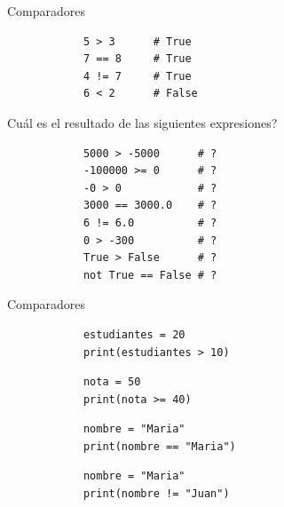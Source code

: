 \documentclass{beamer}
\begin{document}
    \begin{frame}[fragile,t]{Comparadores}
        \begin{verbatim}
            5 > 3      # True
            7 == 8     # True
            4 != 7     # True
            6 < 2      # False
        \end{verbatim}
        Cuál es el resultado de las siguientes expresiones?
        \begin{verbatim}
            5000 > -5000      # ?
            -100000 >= 0      # ?
            -0 > 0            # ?
            3000 == 3000.0    # ?
            6 != 6.0          # ?
            0 > -300          # ?
            True > False      # ?
            not True == False # ?
        \end{verbatim}
    \end{frame}

    \begin{frame}[fragile,t]{Comparadores}
        \begin{verbatim}
            estudiantes = 20
            print(estudiantes > 10)
        \end{verbatim}
        
        \begin{verbatim}
            nota = 50
            print(nota >= 40)
        \end{verbatim}
        
        \begin{verbatim}
            nombre = "Maria"
            print(nombre == "Maria")
        \end{verbatim}
        
        \begin{verbatim}
            nombre = "Maria"
            print(nombre != "Juan")
        \end{verbatim}
    \end{frame}
\end{document}
